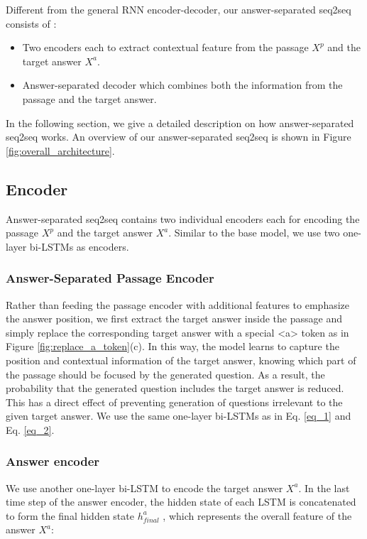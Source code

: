 \documentclass[letterpaper]{article} %
\begin{document}
Different from the general RNN encoder-decoder, our answer-separated seq2seq consists of :
\begin{itemize}
\item Two encoders each to extract contextual feature from the passage \(X^p\) and the target answer \(X^a\).
\item Answer-separated decoder which combines both the information from the passage and the target answer.
\end{itemize}

In the following section, we give a detailed description on how answer-separated seq2seq works. An overview of our answer-separated seq2seq is shown in Figure \ref{fig:overall_architecture}.

\subsection{Encoder}
Answer-separated seq2seq contains two individual encoders each for encoding the passage \(X^p\) and the target answer \(X^a\). Similar to the base model, we use two one-layer bi-LSTMs as encoders.

\subsubsection{Answer-Separated Passage Encoder}
Rather than feeding the passage encoder with additional features to emphasize the answer position, we first extract the target answer inside the passage and simply replace the corresponding target answer with a special \textless a\textgreater{} token as in Figure \ref{fig:replace_a_token}(c). In this way, the model learns to capture the position and contextual information of the target answer, knowing which part of the passage should be focused by the generated question. As a result, the probability that the generated question includes the target answer is reduced. This has a direct effect of preventing generation of questions irrelevant to the given target answer. We use the same one-layer bi-LSTMs as in Eq. \eqref{eq_1} and Eq. \eqref{eq_2}.

\subsubsection{Answer encoder}
We use another one-layer bi-LSTM to encode the target answer \(X^a\). In the last time step of the answer encoder, the hidden state of each LSTM is concatenated to form the final hidden state \(h^a_{final}\) , which represents the overall feature of the answer \(X^a\):
\end{document}
